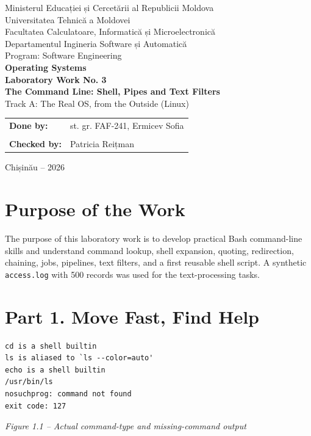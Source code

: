 \documentclass[12pt,a4paper]{article}
\newcommand{\figcap}[1]{\begin{center}\small\textit{#1}\end{center}\vspace{0.4em}}
\begin{document}
\begin{titlepage}
\begin{center}
{\large Ministerul Educației și Cercetării al Republicii Moldova}\\[0.3cm]
{\large Universitatea Tehnică a Moldovei}\\[0.3cm]
{\large Facultatea Calculatoare, Informatică și Microelectronică}\\[0.3cm]
{\large Departamentul Ingineria Software și Automatică}\\[0.3cm]
{\large Program: Software Engineering}\\[2.0cm]
{\Large \textbf{Operating Systems}}\\[0.8cm]
{\LARGE \textbf{Laboratory Work No. 3}}\\[0.5cm]
{\Large \textbf{The Command Line: Shell, Pipes and Text Filters}}\\[0.35cm]
{\large Track A: The Real OS, from the Outside (Linux)}
\vfill
\begin{flushright}
\begin{tabular}{ll}
\textbf{Done by:} & st. gr. FAF-241, Ermicev Sofia \\
\\
\textbf{Checked by:} & Patricia Reițman
\end{tabular}
\end{flushright}
\vfill
{\large Chișinău -- 2026}
\end{center}
\end{titlepage}
\tableofcontents
\newpage

\section{Purpose of the Work}
The purpose of this laboratory work is to develop practical Bash command-line skills and understand command lookup, shell expansion, quoting, redirection, chaining, jobs, pipelines, text filters, and a first reusable shell script. A synthetic \texttt{access.log} with 500 records was used for the text-processing tasks.

\section{Part 1. Move Fast, Find Help}
\begin{lstlisting}
cd is a shell builtin
ls is aliased to `ls --color=auto'
echo is a shell builtin
/usr/bin/ls
nosuchprog: command not found
exit code: 127
\end{lstlisting}
\figcap{Figure 1.1 -- Actual command-type and missing-command output}
\end{document}
